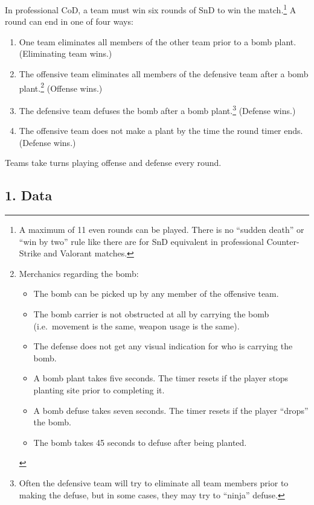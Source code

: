 \documentclass[
]{article}
\providecommand{\tightlist}{%
  \setlength{\itemsep}{0pt}\setlength{\parskip}{0pt}}\usepackage{longtable,booktabs,array}
\begin{document}
In professional CoD, a team must win six rounds of SnD to win the
match.\footnote{A maximum of 11 even rounds can be played. There is no
  ``sudden death'' or ``win by two'' rule like there are for SnD
  equivalent in professional Counter-Strike and Valorant matches.} A
round can end in one of four ways:

\begin{enumerate}
\def\labelenumi{\arabic{enumi}.}
\tightlist
\item
  One team eliminates all members of the other team prior to a bomb
  plant. (Eliminating team wins.)
\item
  The offensive team eliminates all members of the defensive team after
  a bomb plant.\footnote{Merchanics regarding the bomb:

    \begin{itemize}
    \tightlist
    \item
      The bomb can be picked up by any member of the offensive team.
    \item
      The bomb carrier is not obstructed at all by carrying the bomb
      (i.e.~movement is the same, weapon usage is the same).
    \item
      The defense does not get any visual indication for who is carrying
      the bomb.
    \item
      A bomb plant takes five seconds. The timer resets if the player
      stops planting site prior to completing it.
    \item
      A bomb defuse takes seven seconds. The timer resets if the player
      ``drops'' the bomb.
    \item
      The bomb takes 45 seconds to defuse after being planted.
    \end{itemize}} (Offense wins.)
\item
  The defensive team defuses the bomb after a bomb plant.\footnote{Often
    the defensive team will try to eliminate all team members prior to
    making the defuse, but in some cases, they may try to ``ninja''
    defuse.} (Defense wins.)
\item
  The offensive team does not make a plant by the time the round timer
  ends. (Defense wins.)
\end{enumerate}

Teams take turns playing offense and defense every round.

\hypertarget{data}{%
\subsection{1. Data}\label{data}}
\end{document}
